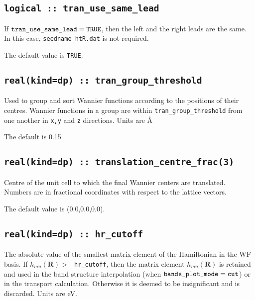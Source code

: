 \subsection[tran\_use\_same\_lead]{\tt logical :: tran\_use\_same\_lead}

If $\verb#tran_use_same_lead#=\verb#TRUE#$, then the
left and the right leads are the same. In this case, 
\verb#seedname_htR.dat# is not required.

The default value is {\tt TRUE}.

\subsection[tran\_group\_threshold]{\tt real(kind=dp) :: tran\_group\_threshold}

Used to group and sort Wannier functions according to the positions of their centres.
Wannier functions in a group are within \verb#tran_group_threshold#
from one another in \verb#x,y# and \verb#z# directions. Units are \AA

The default is 0.15

\subsection[translation\_centre\_frac]{\tt real(kind=dp) :: translation\_centre\_frac(3)}

Centre of the unit cell to which the final Wannier centers are
translated. Numbers are in fractional coordinates with respect to the
lattice vectors.
 
The default value is (0.0,0.0,0.0).

\subsection[hr\_cutoff]{\tt real(kind=dp) :: hr\_cutoff}

The absolute value of the smallest matrix element of the
Hamiltonian in the WF basis.
If $h_{mn}(\mathbf{R})>\:${\tt
  hr\_cutoff}, then the matrix element
$h_{mn}(\mathbf{R})$ is retained and used in
the band structure interpolation (when $\verb#bands_plot_mode#=\verb#cut#$)
or in the transport calculation.
Otherwise it is deemed to be insignificant
and is discarded. Units are eV.



